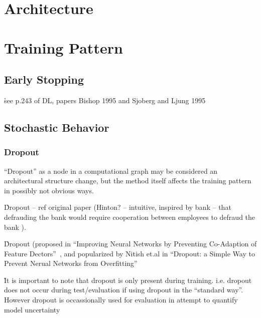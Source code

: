 


\section{Architecture}

\section{Training Pattern}

\subsection{Early Stopping}

\r{see p.243 of DL, papers Bishop 1995 and Sjoberg and Ljung 1995}



\subsection{Stochastic Behavior}

\subsubsection{Dropout}

\r{``Dropout'' as a node in a computational graph may be considered an architectural structure change, but the method itself affects the training pattern in possibly not obvious ways. }


\r{Dropout -- ref original paper (Hinton? -- intuitive, inspired by bank -- that defrauding the bank would require cooperation between employees to defraud the bank )}.

\r{Dropout (proposed in ``Improving Neural Networks by Preventing Co-Adaption of Feature Dectors''~\cite{DBLP:journals/corr/abs-1207-0580}, and popularized by Nitish et.al in ``Dropout: a Simple Way to Prevent Nerual Networks from Overfitting''~\cite{JMLR:v15:srivastava14a}}

\r{It is important to note that dropout is only present during training. i.e. dropout does not occur during test/evaluation if using dropout in the ``standard way''. However dropout is occassionally used for evaluation in attempt to quantify model uncertainty }

